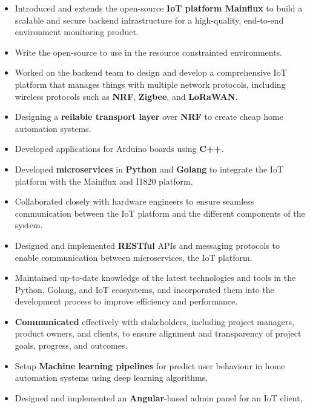 \vspace{1cm}

\vspace{0.5cm}
\begin{itemize}
  \item Introduced and extends the open-source \textbf{IoT platform Mainflux} to build a scalable and secure backend
        infrastructure for a high-quality, end-to-end environment monitoring product.
  \item Write the open-source  to use in the resource constrainted environments.
  \item Worked on the backend team to design and develop a comprehensive IoT platform that manages things with multiple network protocols,
        including wireless protocols such as \textbf{NRF}, \textbf{Zigbee}, and \textbf{LoRaWAN}.
  \item Designing a \textbf{reilable transport layer} over \textbf{NRF} to create cheap home automation systems.
  \item Developed applications for Arduino boards using \textbf{C++}.
  \item Developed \textbf{microservices} in \textbf{Python} and \textbf{Golang} to integrate the IoT platform with the Mainflux and I1820 platform.
  \item Collaborated closely with hardware engineers to ensure seamless communication between the IoT
        platform and the different components of the system.
  \item Designed and implemented \textbf{RESTful} APIs and messaging protocols to
        enable communication between microservices, the IoT platform.
  \item Maintained up-to-date knowledge of the latest technologies and tools in the Python,
        Golang, and IoT ecosystems, and incorporated them into the development process to improve efficiency and performance.
  \item \textbf{Communicated} effectively with stakeholders, including project managers, product owners, and clients,
        to ensure alignment and transparency of project goals, progress, and outcomes.
  \item Setup \textbf{Machine learning pipelines} for predict user behaviour in home automation systems using deep learning algorithms.
  \item Designed and implemented an \textbf{Angular}-based admin panel for an IoT client,

\end{itemize}
